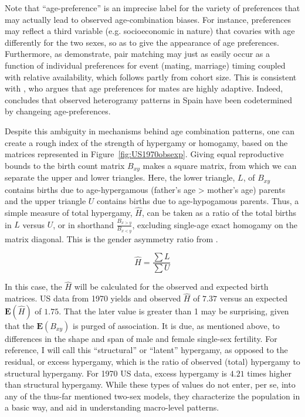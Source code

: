 Note that ``age-preference'' is an imprecise label for the variety
of preferences that may actually lead to observed age-combination biases. For
instance, preferences may reflect a third variable (e.g. socioeconomic
in nature) that covaries with age differently for the two sexes, so as to give
the appearance of age preferences. Furthermore, as \citet{bergstrom1994sweden}
demonstrate, pair matching may just as easily occur as a function of individual
preferences for event (mating, marriage) timing coupled with relative
availability, which follows partly from cohort size. This is consistent with
\citet{bhrolchain2001flexibility}, who argues that age preferences for
mates are highly adaptive. Indeed, \citet{esteve2009long} concludes that
observed heterogramy patterns in Spain have been codetermined by changeing
age-preferences.

Despite this ambiguity in mechanisms behind age combination patterns, one can
create a rough index of the strength of hypergamy or homogamy, based on the
matrices represented in Figure~\ref{fig:US1970obsexp}. Giving equal reproductive
bounds to the birth count matrix $B_{xy}$ makes a square matrix, from which we
can separate the upper and lower triangles. Here, the lower triangle, $L$,
of $B_{xy}$ contains births due to age-hypergamous (father's age > mother's
age) parents and the upper triangle $U$ contains births due to
age-hypogamous parents. Thus, a simple measure of total hypergamy, $\widehat{H}$, 
can be taken as a ratio of the total births in $L$ versus $U$, or in shorthand 
$\frac{B_{x>y}}{B_{x<y}}$, excluding single-age exact homogamy on the matrix
diagonal. This is the gender asymmetry ratio from \citet{esteve2009long}.

\begin{equation}
\widehat{H} = \frac{\sum L}{\sum U} 
\end{equation}

In this case, the $\widehat{H}$ will be calculated for the observed and expected
birth matrices. US data from 1970 yields and observed $\widehat{H}$ of $7.37$
versus an expected $\textbf{E}(\widehat{H})$ of $1.75$. That the later value is
greater than 1 may be surprising, given that the $\textbf{E}(B_{xy})$ is purged
of association. It is due, as mentioned above, to differences in the shape
and span of male and female single-sex fertility. For reference, I
will call this ``structural'' or ``latent'' hypergamy, as opposed to the
residual, or excess hypergamy, which is the ratio of observed (total) hypergamy to
structural hypergamy. For 1970 US data, excess hypergamy is $4.21$ times higher
than structural hypergamy. While these types of values do not enter, per se, 
into any of the thus-far mentioned two-sex models, they characterize the 
population in a basic way, and aid in understanding macro-level patterns. 

